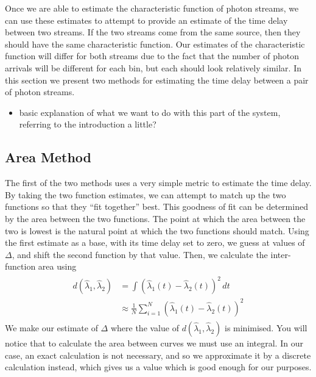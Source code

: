 \documentclass[a4paper,11pt]{article}
\begin{document}
Once we are able to estimate the characteristic function of photon streams, we
can use these estimates to attempt to provide an estimate of the time delay
between two streams. If the two streams come from the same source, then they
should have the same characteristic function. Our estimates of the
characteristic function will differ for both streams due to the fact that the
number of photon arrivals will be different for each bin, but each should look
relatively similar. In this section we present two methods for estimating the
time delay between a pair of photon streams.
\begin{itemize}
\item basic explanation of what we want to do with this part of the system,
  referring to the introduction a little?
\end{itemize}
\subsection{Area Method}
\label{sec-6-1}

The first of the two methods uses a very simple metric to estimate the time
delay. By taking the two function estimates, we can attempt to match up the two
functions so that they ``fit together'' best. This goodness of fit can be
determined by the area between the two functions. The point at which the area
between the two is lowest is the natural point at which the two functions should
match. Using the first estimate as a base, with its time delay set to zero, we
guess at values of $\Delta$, and shift the second function by that value. Then,
we calculate the inter-function area using
\begin{align}
\begin{split}
d(\hat{\lambda}_1,\hat{\lambda}_2)&=\int(\hat{\lambda}_1(t)-\hat{\lambda}_2(t))^2\,dt\\
&\approx\frac{1}{N}\sum_{i=1}^N(\hat{\lambda}_1(t)-\hat{\lambda}_2(t))^2
\end{split}
\end{align}
We make our estimate of $\Delta$ where the value of
$d(\hat{\lambda}_1,\hat{\lambda}_2)$ is minimised. You will notice that to
calculate the area between curves we must use an integral. In our case, an exact
calculation is not necessary, and so we approximate it by a discrete calculation
instead, which gives us a value which is good enough for our purposes.
      
\end{document}
